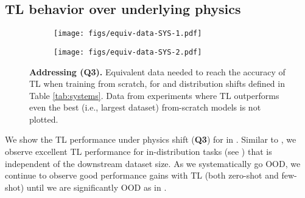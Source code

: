 \subsection{TL behavior over underlying physics}
\label{sec:tl_shift}
\begin{figure*}
  \begin{subfigure}{.5\textwidth}
  \centering
  \texttt{[image: figs/equiv-data-SYS-1.pdf]}  
\end{subfigure}%
\begin{subfigure}{.5\textwidth}
  \centering
  \texttt{[image: figs/equiv-data-SYS-2.pdf]}  
\end{subfigure}
\caption{\textbf{Addressing (Q3).} Equivalent data needed to reach the accuracy of TL when training from scratch, for \sysA{} and \sysB{} distribution shifts defined in Table \ref{tab:systems}. Data from experiments where TL outperforms even the best (i.e., largest dataset) from-scratch models is not plotted.}
\label{fig:data-equiv}
\end{figure*}


We show the TL performance under physics shift (\textbf{Q3}) for \sysB{} in . Similar to \sysA{}, we observe excellent TL performance for in-distribution tasks (see ) that is independent of the downstream dataset size. As we systematically go OOD, we continue to observe good performance gains with TL (both zero-shot and few-shot) until we are significantly OOD as in .

